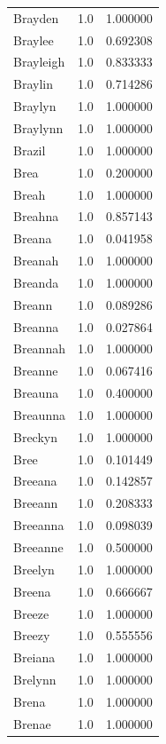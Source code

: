 \documentclass[
  letterpaper,
  DIV=11,
  numbers=noendperiod]{scrreprt}
\begin{document}
\begin{tabular}{lrr}
Brayden         &   1.0 &   1.000000 \\
Braylee         &   1.0 &   0.692308 \\
Brayleigh       &   1.0 &   0.833333 \\
Braylin         &   1.0 &   0.714286 \\
Braylyn         &   1.0 &   1.000000 \\
Braylynn        &   1.0 &   1.000000 \\
Brazil          &   1.0 &   1.000000 \\
Brea            &   1.0 &   0.200000 \\
Breah           &   1.0 &   1.000000 \\
Breahna         &   1.0 &   0.857143 \\
Breana          &   1.0 &   0.041958 \\
Breanah         &   1.0 &   1.000000 \\
Breanda         &   1.0 &   1.000000 \\
Breann          &   1.0 &   0.089286 \\
Breanna         &   1.0 &   0.027864 \\
Breannah        &   1.0 &   1.000000 \\
Breanne         &   1.0 &   0.067416 \\
Breauna         &   1.0 &   0.400000 \\
Breaunna        &   1.0 &   1.000000 \\
Breckyn         &   1.0 &   1.000000 \\
Bree            &   1.0 &   0.101449 \\
Breeana         &   1.0 &   0.142857 \\
Breeann         &   1.0 &   0.208333 \\
Breeanna        &   1.0 &   0.098039 \\
Breeanne        &   1.0 &   0.500000 \\
Breelyn         &   1.0 &   1.000000 \\
Breena          &   1.0 &   0.666667 \\
Breeze          &   1.0 &   1.000000 \\
Breezy          &   1.0 &   0.555556 \\
Breiana         &   1.0 &   1.000000 \\
Brelynn         &   1.0 &   1.000000 \\
Brena           &   1.0 &   1.000000 \\
Brenae          &   1.0 &   1.000000 \\

\end{tabular}
\end{document}
